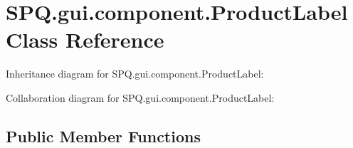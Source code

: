 \hypertarget{class_s_p_q_1_1gui_1_1component_1_1_product_label}{}\section{S\+P\+Q.\+gui.\+component.\+Product\+Label Class Reference}
\label{class_s_p_q_1_1gui_1_1component_1_1_product_label}


Inheritance diagram for S\+P\+Q.\+gui.\+component.\+Product\+Label\+:


Collaboration diagram for S\+P\+Q.\+gui.\+component.\+Product\+Label\+:
\subsection*{Public Member Functions}
